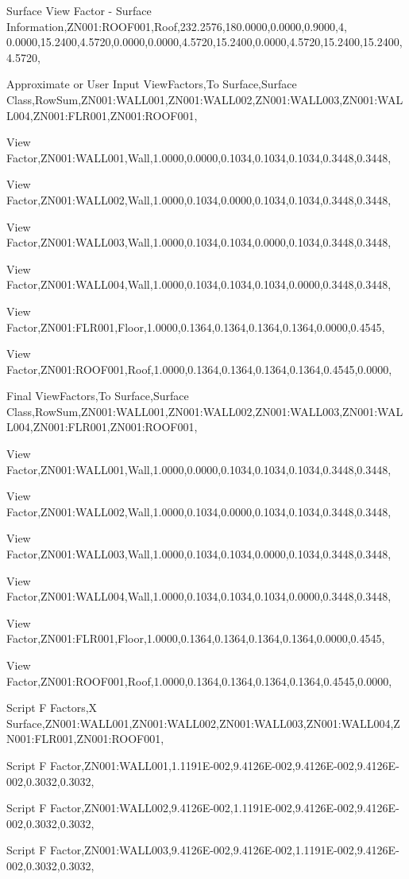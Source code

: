Surface View Factor - Surface Information,ZN001:ROOF001,Roof,232.2576,180.0000,0.0000,0.9000,4, 0.0000,15.2400,4.5720,0.0000,0.0000,4.5720,15.2400,0.0000,4.5720,15.2400,15.2400,4.5720,

Approximate or User Input ViewFactors,To Surface,Surface Class,RowSum,ZN001:WALL001,ZN001:WALL002,ZN001:WALL003,ZN001:WALL004,ZN001:FLR001,ZN001:ROOF001,

View Factor,ZN001:WALL001,Wall,1.0000,0.0000,0.1034,0.1034,0.1034,0.3448,0.3448,

View Factor,ZN001:WALL002,Wall,1.0000,0.1034,0.0000,0.1034,0.1034,0.3448,0.3448,

View Factor,ZN001:WALL003,Wall,1.0000,0.1034,0.1034,0.0000,0.1034,0.3448,0.3448,

View Factor,ZN001:WALL004,Wall,1.0000,0.1034,0.1034,0.1034,0.0000,0.3448,0.3448,

View Factor,ZN001:FLR001,Floor,1.0000,0.1364,0.1364,0.1364,0.1364,0.0000,0.4545,

View Factor,ZN001:ROOF001,Roof,1.0000,0.1364,0.1364,0.1364,0.1364,0.4545,0.0000,

Final ViewFactors,To Surface,Surface Class,RowSum,ZN001:WALL001,ZN001:WALL002,ZN001:WALL003,ZN001:WALL004,ZN001:FLR001,ZN001:ROOF001,

View Factor,ZN001:WALL001,Wall,1.0000,0.0000,0.1034,0.1034,0.1034,0.3448,0.3448,

View Factor,ZN001:WALL002,Wall,1.0000,0.1034,0.0000,0.1034,0.1034,0.3448,0.3448,

View Factor,ZN001:WALL003,Wall,1.0000,0.1034,0.1034,0.0000,0.1034,0.3448,0.3448,

View Factor,ZN001:WALL004,Wall,1.0000,0.1034,0.1034,0.1034,0.0000,0.3448,0.3448,

View Factor,ZN001:FLR001,Floor,1.0000,0.1364,0.1364,0.1364,0.1364,0.0000,0.4545,

View Factor,ZN001:ROOF001,Roof,1.0000,0.1364,0.1364,0.1364,0.1364,0.4545,0.0000,

Script F Factors,X Surface,ZN001:WALL001,ZN001:WALL002,ZN001:WALL003,ZN001:WALL004,ZN001:FLR001,ZN001:ROOF001,

Script F Factor,ZN001:WALL001,1.1191E-002,9.4126E-002,9.4126E-002,9.4126E-002,0.3032,0.3032,

Script F Factor,ZN001:WALL002,9.4126E-002,1.1191E-002,9.4126E-002,9.4126E-002,0.3032,0.3032,

Script F Factor,ZN001:WALL003,9.4126E-002,9.4126E-002,1.1191E-002,9.4126E-002,0.3032,0.3032,

